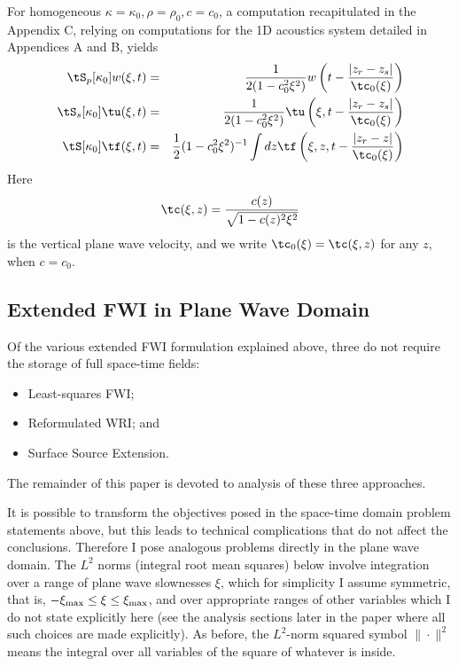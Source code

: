 For homogeneous $\kappa=\kappa_0, \rho=\rho_0, c=c_0$, a computation
recapitulated in the Appendix C, relying on computations for the 1D
acoustics system detailed in Appendices A and B, yields
\begin{eqnarray}
  \label{eqn:ptmodhompw}
  \tS_p[\kappa_0]w(\xi,t) & = &\frac{1}{2(1-c_0^2\xi^2)}w
                                \left(t-\frac{|z_r-z_s|}{\tc_0(\xi)}\right)\\
    \label{eqn:ssmodhompw}
  \tS_s[\kappa_0]\tu(\xi,t) & = &\frac{1}{2(1-c_0^2\xi^2)}\tu 
                                  \left(\xi,t-\frac{|z_r-z_s|}{\tc_0(\xi)}\right)\\
    \label{eqn:stmodhompw}
  \tS[\kappa_0]\tf(\xi,t) & = &  \frac{1}{2}(1-c_0^2\xi^2)^{-1}\int dz \tf\left(\xi,z,t -
                                \frac{|z_r-z|}{\tc_0(\xi)}\right)                              
\end{eqnarray}
Here
\begin{equation}
  \label{eqn:vertvel}
  \tc(\xi,z) = \frac{c(z)}{\sqrt{1-c(z)^2\xi^2}}
    \end{equation}
is the vertical plane wave velocity, and we write
$\tc_0(\xi)=\tc(\xi,z)$ for any $z$, when $c=c_0$.

\subsection{Extended FWI in Plane Wave Domain}
Of the various extended FWI formulation explained above, three do not
require the storage of full space-time fields:
\begin{itemize}
\item Least-squares FWI;
\item Reformulated WRI; and
\item Surface Source Extension.
\end{itemize}
The remainder of this paper is devoted to analysis of these three
approaches.

It is possible to transform the objectives posed in the space-time
domain problem statements above, but this leads to technical
complications that do not affect the conclusions. Therefore I pose
analogous problems directly in the plane wave domain. The $L^2$ norms
(integral root mean squares) below involve integration over a range of
plane wave slownesses $\xi$, which for simplicity I assume symmetric,
that is, $-\xi_{\rm max} \le \xi \le \xi_{\rm max}$, and over
appropriate ranges of other variables which I do not state explicitly
here (see the analysis sections later in the paper where all such
choices are made explicitly). As before, the $L^2$-norm squared symbol
$\|\cdot\|^2$ means the integral over all variables of the square of
whatever is inside.

